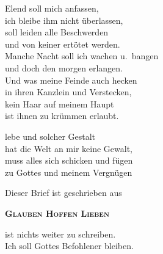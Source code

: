 \documentclass[
  paper=a3,
  fontsize=20pt,
  parskip=half,
  twocolumn,
  DIV=16,
]{scrartcl}
\newcommand{\glaubenhoffenlieben}{%
  \centerline{Dieser Brief ist geschrieben aus}
  \centerline{\serif\bfseries\scshape\color{ghlcolor}Glauben Hoffen Lieben}%
}
\begin{document}
 Elend soll mich anfassen, \\
ich bleibe ihm nicht überlassen, \\
soll leiden alle Beschwerden \\
und von keiner ertötet werden. \\
Manche Nacht  soll ich wachen u.\ bangen \\
und doch den morgen erlangen. \\
Und was meine Feinde auch hecken  \\
in ihren Kanzlein und Verstecken, \\
kein Haar auf meinem Haupt \\
ist ihnen zu krümmen erlaubt.

 lebe und solcher Gestalt \\
hat die Welt an mir keine Gewalt, \\
muss alles sich schicken und fügen \\
zu Gottes und meinem Vergnügen

\vspace{1em}
\glaubenhoffenlieben

\initialEs ist nichts weiter zu schreiben. \\
Ich soll Gottes Befohlener bleiben.%
\end{document}
